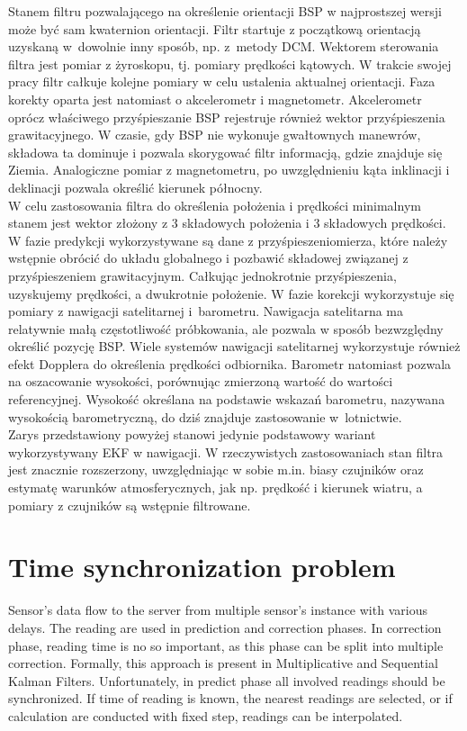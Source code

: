 Stanem filtru pozwalającego na określenie orientacji BSP w najprostszej wersji może być sam kwaternion orientacji. Filtr startuje z początkową orientacją uzyskaną w~dowolnie inny sposób, np. z~metody DCM. Wektorem sterowania filtra jest pomiar z żyroskopu, tj. pomiary prędkości kątowych. W trakcie swojej pracy filtr całkuje kolejne pomiary w celu ustalenia aktualnej orientacji. Faza korekty oparta jest natomiast o akcelerometr i magnetometr. Akcelerometr oprócz właściwego przyśpieszanie BSP rejestruje również wektor przyśpieszenia grawitacyjnego. W czasie, gdy BSP nie wykonuje gwałtownych manewrów, składowa ta dominuje i pozwala skorygować filtr informacją, gdzie znajduje się Ziemia. Analogiczne pomiar z magnetometru, po uwzględnieniu kąta inklinacji i deklinacji pozwala określić kierunek północny.\\

W celu zastosowania filtra do określenia położenia i prędkości minimalnym stanem jest wektor złożony z 3 składowych położenia i 3 składowych prędkości. W fazie predykcji wykorzystywane są dane z przyśpieszeniomierza, które należy wstępnie obrócić do układu globalnego i pozbawić składowej związanej z przyśpieszeniem grawitacyjnym. Całkując jednokrotnie przyśpieszenia, uzyskujemy prędkości, a dwukrotnie położenie. W fazie korekcji wykorzystuje się pomiary z nawigacji satelitarnej i~barometru. Nawigacja satelitarna ma relatywnie małą częstotliwość próbkowania, ale pozwala w sposób bezwzględny określić pozycję BSP. Wiele systemów nawigacji satelitarnej wykorzystuje również efekt Dopplera do określenia prędkości odbiornika. Barometr natomiast pozwala na oszacowanie wysokości, porównując zmierzoną wartość do wartości referencyjnej. Wysokość określana na podstawie wskazań barometru, nazywana wysokością barometryczną, do dziś znajduje zastosowanie w~lotnictwie.\\

Zarys przedstawiony powyżej stanowi jedynie podstawowy wariant wykorzystywany EKF w nawigacji. W rzeczywistych zastosowaniach stan filtra jest znacznie rozszerzony, uwzględniając w sobie m.in. biasy czujników oraz estymatę warunków atmosferycznych, jak np. prędkość i kierunek wiatru, a pomiary z czujników są wstępnie filtrowane.

\section{Time synchronization problem}

Sensor's data flow to the server from multiple sensor's instance with various delays. The reading are used in prediction and correction phases. In correction phase, reading time is no so important, as this phase can be split into multiple correction. Formally, this approach is present in Multiplicative and Sequential Kalman Filters. Unfortunately, in predict phase all involved readings should be synchronized. If time of reading is known, the nearest readings are selected, or if calculation are conducted with fixed step, readings can be interpolated.\\

